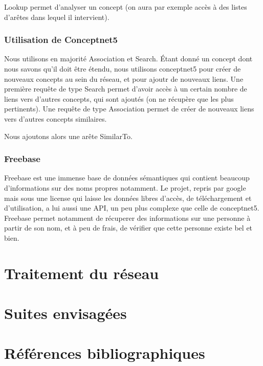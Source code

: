 \documentclass[a4paper,12pt]{article}
\begin{document}
Lookup permet d'analyser un concept (on aura par exemple accès à des listes d'arêtes dans lequel il intervient).


\subsubsection{Utilisation de Conceptnet5}

Nous utilisons en majorité Association et Search.
Étant donné un concept dont nous savons qu'il doit être étendu, nous utilisons conceptnet5 pour créer de nouveaux concepts au sein du réseau, et pour ajoutr de nouveaux liens. Une première requête de type Search permet d'avoir accès à un certain nombre de liens vers d'autres concepts, qui sont ajoutés (on ne récupère que les plus pertinents). Une requête de type Association permet de créer de nouveaux liens vers d'autres concepts similaires.

Nous ajoutons alors une arête SimilarTo.



    
\subsubsection{Freebase}

Freebase est une immense base de données sémantiques qui contient beaucoup d'informations sur des noms propres notamment. Le projet, repris par google mais sous une license qui laisse les données libres d'accès, de téléchargement et d'utilisation, a lui aussi une API, un peu plus complexe que celle de conceptnet5. Freebase permet notamment de récuperer des informations sur une personne à partir de son nom, et à peu de frais, de vérifier que cette personne existe bel et bien.

    
    

\section{Traitement du r\'eseau}

\section{Suites envisag\'ees}

\section{R\'ef\'erences bibliographiques}

\nocite{*}
\printbibliography



\appendix

\printindex
\end{document}
